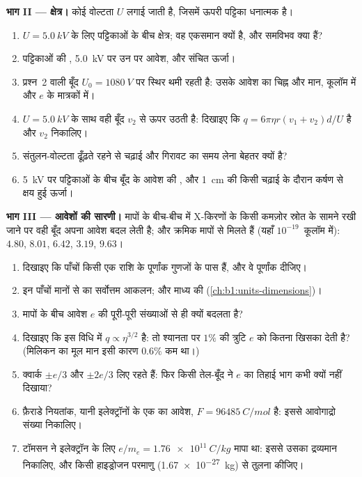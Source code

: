 \begin{problem}
\medskip
\noindent\textbf{भाग II --- क्षेत्र।}
कोई वोल्टता $U$ लगाई जाती है, जिसमें ऊपरी पट्टिका धनात्मक है।
\begin{enumerate}[resume]
  \item $U = \qty{5.0}{kV}$ के लिए पट्टिकाओं के बीच क्षेत्र; वह एकसमान
        क्यों है, और समविभव क्या हैं?
  \item पट्टिकाओं की , \qty{5.0}{kV} पर उन पर आवेश, और संचित
        ऊर्जा।
  \item प्रश्न~2 वाली बूँद $U_0 = \qty{1080}{V}$ पर स्थिर थमी रहती है:
        उसके आवेश का चिह्न और मान, कूलॉम में और $e$ के मात्रकों में।
  \item $U = \qty{5.0}{kV}$ के साथ वही बूँद $v_2$ से ऊपर उठती है: दिखाइए
        कि $q = 6\pi\eta r(v_1 + v_2)d/U$ है और $v_2$ निकालिए।
  \item संतुलन-वोल्टता ढूँढ़ते रहने से चढ़ाई और गिरावट का समय लेना बेहतर
        क्यों है?
  \item \qty{5}{kV} पर पट्टिकाओं के बीच बूँद के आवेश की , और
        \qty{1}{cm} की किसी चढ़ाई के दौरान कर्षण से क्षय हुई ऊर्जा।
\end{enumerate}

\medskip
\noindent\textbf{भाग III --- आवेशों की सारणी।}
मापों के बीच-बीच में X-किरणों के किसी कमज़ोर स्रोत के सामने रखी जाने पर वही
बूँद अपना आवेश बदल लेती है; और क्रमिक मापों से मिलते हैं (यहाँ $10^{-19}$~कूलॉम में):
$4.80$, $8.01$, $6.42$, $3.19$, $9.63$।
\begin{enumerate}[resume]
  \item दिखाइए कि पाँचों किसी एक राशि के पूर्णांक गुणजों के पास हैं, और वे
        पूर्णांक दीजिए।
  \item इन पाँचों मानों से  का सर्वोत्तम आकलन; और माध्य की  (\cref{ch:b1:units-dimensions})।
  \item मापों के बीच आवेश $e$ की पूरी-पूरी संख्याओं से ही क्यों बदलता है?
  \item दिखाइए कि इस विधि में $q \propto \eta^{3/2}$ है: तो श्यानता पर
        $1\%$ की त्रुटि $e$ को कितना खिसका देती है? (मिलिकन का मूल मान
        इसी कारण $0.6\%$ कम था।)
  \item क्वार्क $\pm e/3$ और $\pm 2e/3$ लिए रहते हैं: फिर किसी तेल-बूँद ने
        $e$ का तिहाई भाग कभी क्यों नहीं दिखाया?
  \item फ़ैराडे नियतांक, यानी इलेक्ट्रॉनों के एक  का आवेश,
        $F = \qty{96485}{C/mol}$ है: इससे आवोगाद्रो संख्या निकालिए।
  \item टॉमसन ने इलेक्ट्रॉन के लिए $e/m_e = \qty{1.76e11}{C/kg}$ मापा था:
        इससे उसका द्रव्यमान निकालिए, और किसी हाइड्रोजन परमाणु
        (\qty{1.67e-27}{kg}) से तुलना कीजिए।
\end{enumerate}


\end{problem}
